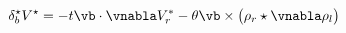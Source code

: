 \begin{equation}
\delta^{\star}_{b}V^{\star}
=-t\vb\cdot\vnabla V^*_{r}
-\theta\vb\times\big(\rho_{r}\star\vnabla\rho_{l}\big)
\end{equation}

